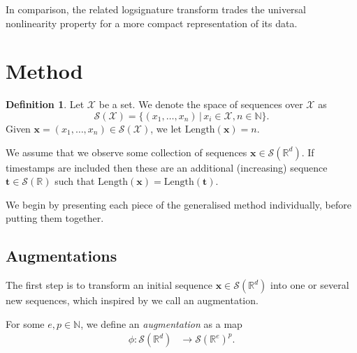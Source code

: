 \documentclass{article}
\theoremstyle{definition}
\newtheorem{definition}{Definition}
\theoremstyle{remark}
\newcommand{\reals}{\mathbb{R}}
\newcommand{\naturals}{\mathbb{N}}
\newcommand{\tseries}[1]{\mathcal{S}(#1)}
\newcommand{\len}[1]{\mathrm{Length}(#1)}
\begin{document}
	In comparison, the related logsignature transform \citep{logsig-rnn} trades the universal nonlinearity property for a more compact representation of its data.
	
	\section{Method}\label{sec:method}	
	\begin{definition}
	Let $\mathcal{X}$ be a set. We denote the space of sequences over $\mathcal{X}$ as
	\begin{equation*}
	\tseries{\mathcal{X}} = \{(x_1, \ldots, x_n) \,\vert\, x_i \in \mathcal{X}, n \in \naturals\}.
	\end{equation*}
	Given $\mathbf{x} = (x_1, \ldots, x_n) \in \tseries{\mathcal{X}}$, we let $\len{\mathbf{x}} = n$.
	\end{definition}
	
	We assume that we observe some collection of sequences $\mathbf{x} \in \tseries{\reals^d}$. If timestamps are included then these are an additional (increasing) sequence $\mathbf{t} \in \tseries{\reals}$ such that $\len{\mathbf{x}} = \len{\mathbf{t}}$.
	
	
	We begin by presenting each piece of the generalised method individually, before putting them together.

	\subsection{Augmentations}\label{section:augmentations}
	The first step is to transform an initial sequence $\mathbf{x} \in \tseries{\reals^d}$ into one or several new sequences, which inspired by \citet{kidger2019deep} we call an augmentation.
	
	For some $e,p \in \naturals$, we define an \emph{augmentation} as a map
	\begin{align*}
	\phi \colon \tseries{\reals^d} &\to \tseries{\reals^e}^p.
	\end{align*}
	
\end{document}
